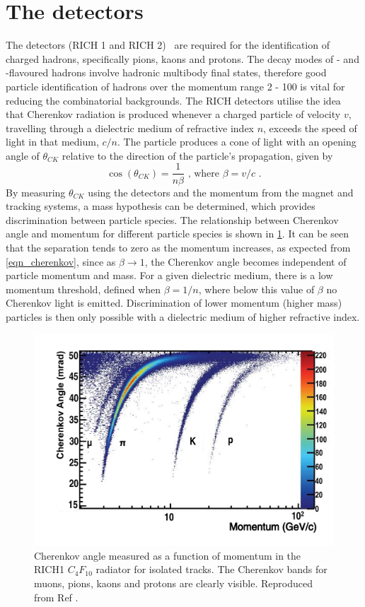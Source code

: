 \section{The \rich detectors}
\label{sec:detector:rich}

The \rich detectors (RICH 1 and RICH 2)~\cite{LHCb-DP-2012-003} are required for the identification of charged hadrons, specifically pions, kaons and protons. The decay modes of \bquark- and \cquark-flavoured hadrons involve hadronic multibody final states, therefore good particle identification of hadrons over the momentum range 2 - 100 \gevc is vital for reducing the combinatorial backgrounds. The RICH detectors utilise the idea that Cherenkov radiation is produced whenever a charged particle of velocity $v$, travelling through a dielectric medium of refractive index $n$, exceeds the speed of light in that medium, $c/n$. The particle produces a cone of light with an opening angle of $\theta_{CK}$ relative to the direction of the particle's propagation, given by
\begin{equation}
\cos\left(\theta_{CK}\right) = \frac{1}{n\beta} \text{ ,     where }  \beta = v/c \text{ .}
\label{eqn_cherenkov}
\end{equation}
By measuring $\theta_{CK}$ using the \rich detectors and the momentum from the magnet and tracking systems, a mass hypothesis can be determined, which provides discrimination between particle species. The relationship between Cherenkov angle and momentum for different particle species is shown in \fig\ref{richseparation}. It can be seen that the separation tends to zero as the momentum increases, as expected from \eqn\ref{eqn_cherenkov}, since as $\beta \rightarrow 1$, the Cherenkov angle becomes independent of particle momentum and mass. For a given dielectric medium, there is a low momentum threshold, defined when $\beta = 1/n$, where below this value of $\beta$ no Cherenkov light is emitted. Discrimination of lower momentum (higher mass) particles is then only possible with a dielectric medium of higher refractive index.

\begin{figure}
\centering
\includegraphics[width=0.8\linewidth]{figures/detector/richseparation.pdf}
\caption{Cherenkov angle measured as a function of momentum in the RICH1 $C_{4}F_{10}$ radiator for isolated tracks. The Cherenkov bands for muons, pions, kaons and protons are clearly visible. Reproduced from Ref \cite{LHCb-DP-2012-003}.}
\label{richseparation}
\end{figure}

